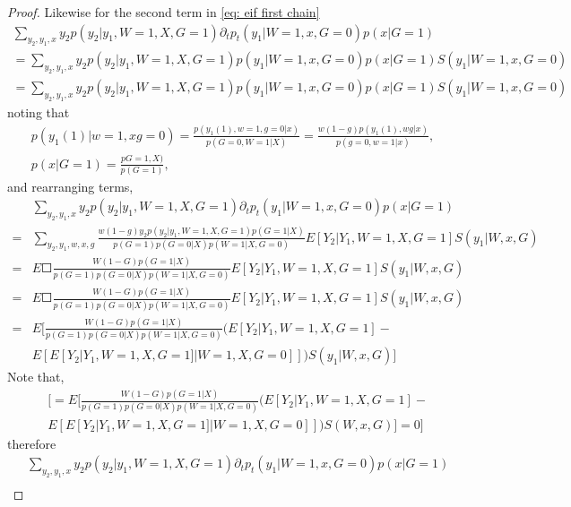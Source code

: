 \documentclass{article}
\begin{document}
\begin{proof}
Likewise for the second term in \ref{eq: eif first chain}
\begin{align*}
    \sum_ { y_2 ,y_1,x} y_2  p ( y_2| y_1 , W= 1, X , G= 1)\partial_t p_t ( y_1 | W =1 , x, G= 0 ) p( x | G =1 ) \\
=   \sum_ { y_2 ,y_1,x} y_2  p ( y_2| y_1 , W= 1, X , G= 1) p ( y_1 | W =1 , x, G= 0 ) p( x | G =1 ) S( y_1  | W =1, x, G = 0)  \\
=   \sum_ { y_2 ,y_1,x} y_2  p ( y_2| y_1 , W= 1, X , G= 1) p ( y_1 | W =1 , x, G= 0 ) p( x | G =1 ) S( y_1  | W =1, x, G = 0)
\end{align*} 
noting that
\begin{align*}
p ( y_1(1) | w = 1, x g = 0 ) = \frac{ p ( y _1(1) , w = 1, g  = 0 |x) } { p ( G =0, W =1 | X) } = \frac{ w ( 1 -g) p( y_1(1) , w g | x) }{ p  (g =0, w =1 | x) } , \\
p ( x | G= 1) = \frac{ p  G =1, X ) } { p(G =1 ) },
\end{align*}
and rearranging terms,
\begin{align*}
&\sum_ { y_2 ,y_1,x} y_2  p ( y_2| y_1 , W= 1, X , G= 1)\partial_t p_t ( y_1 | W =1 , x, G= 0 ) p( x | G =1 ) \\ 
= &\sum_ { y_2 ,y_1,w,x, g} \frac{ w ( 1 -g ) y_2   p ( y_2| y_1 , W= 1, X , G= 1) p(G =1 | X) }{ p(G=1) p ( G= 0 | X)  p ( W = 1 | X ,G =0) } E [ Y_2 |   Y_1 ,W = 1,X, G =1 ]   S( y_1  | W , x, G )  \\
= &E \Square{   \frac{ W ( 1 -G)   p(G =1 | X) }{ p(G=1) p ( G= 0 | X)  p ( W = 1 | X ,G =0) } E [ Y_2 |   Y_1 ,W = 1, X, G =1 ]   S( y_1  | W , x, G )}\\
= &E \Square{  \frac{  W ( 1 -G)   p(G =1 | X) }{ p(G=1) p ( G= 0 | X)  p ( W = 1 | X ,G =0) } E [ Y_2 |   Y_1 ,W = 1, X, G =1 ]   S( y_1  | W , x, G ) }\\
= &E [  \frac{  W ( 1 -G)   p(G =1 | X) }{ p(G=1) p ( G= 0 | X)  p ( W = 1 | X ,G =0) } (E [ Y_2 |   Y_1 ,W = 1, X, G =1 ] - \\
&E [ E[ Y_2 | Y_1 , W =1 , X, G =1 ] | W=1, X, G= 0 ]] )  S( y_1  | W , x, G ) ]
\end{align*}
Note that,
\begin{align}
&[= E [  \frac{  W ( 1 -G)   p(G =1 | X) }{ p(G=1) p ( G= 0 | X)  p ( W = 1 | X ,G =0) } (E [ Y_2 |   Y_1 ,W = 1, X, G =1 ] - \\
&E [ E[ Y_2 | Y_1 , W =1 , X, G =1 ] | W=1, X, G= 0 ]] )  S(  W , x, G ) ] = 0]
\end{align}
therefore
\begin{align*}
&\sum_ { y_2 ,y_1,x} y_2  p ( y_2| y_1 , W= 1, X , G= 1)\partial_t p_t ( y_1 | W =1 , x, G= 0 ) p( x | G =1 ) \\ 

\end{align*}
\end{proof}
\end{document}
